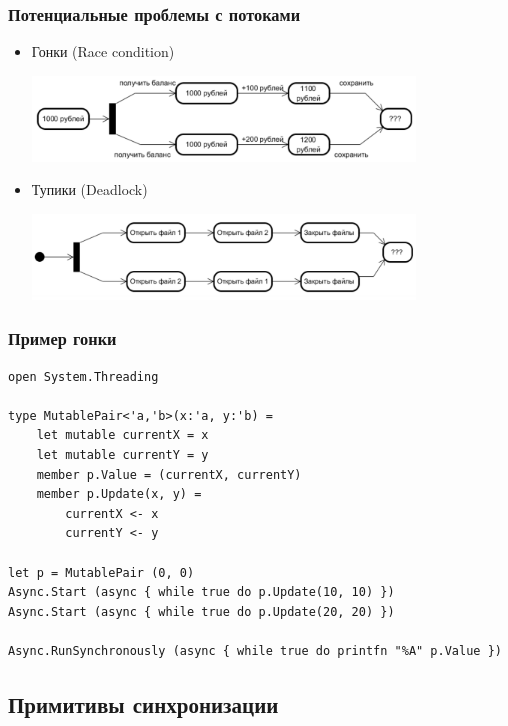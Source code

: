 \documentclass[xetex,mathserif,serif]{beamer}
\begin{document}
	\begin{frame}
		\frametitle{Потенциальные проблемы с потоками}
		\begin{itemize}
			\item Гонки (Race condition)
				\begin{center}
					\includegraphics[width=0.8\textwidth]{raceCondition.png}
				\end{center}
				\vspace{1cm}
			\item Тупики (Deadlock)
				\begin{center}
					\includegraphics[width=0.8\textwidth]{deadlock.png}
				\end{center}
		\end{itemize}
	\end{frame}

	\begin{frame}[fragile]
		\frametitle{Пример гонки}
		\begin{verbatim}
open System.Threading

type MutablePair<'a,'b>(x:'a, y:'b) =
    let mutable currentX = x
    let mutable currentY = y
    member p.Value = (currentX, currentY)
    member p.Update(x, y) =
        currentX <- x
        currentY <- y

let p = MutablePair (0, 0)
Async.Start (async { while true do p.Update(10, 10) })
Async.Start (async { while true do p.Update(20, 20) })

Async.RunSynchronously (async { while true do printfn "%A" p.Value })
		\end{verbatim}
	\end{frame}

	\subsection{Примитивы синхронизации}
\end{document}

